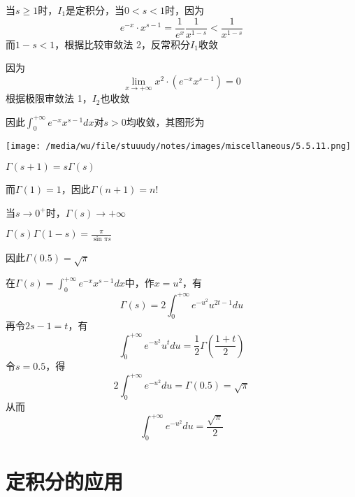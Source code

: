 \documentclass[11pt]{article}
\begin{document}
当\(s\ge1\)时，\(I_1\)是定积分，当\(0<s<1\)时，因为
\begin{equation*}
e^{-x}\cdot x^{s-1}=\frac{1}{e^x}\frac{1}{x^{1-s}}<\frac{1}{x^{1-s}}
\end{equation*}
而\(1-s<1\)，根据比较审敛法 2，反常积分\(I_1\)收敛

因为
\begin{equation*}
\lim_{x\to+\infty}x^2\cdot(e^{-x}x^{s-1})=0
\end{equation*}
根据极限审敛法 1，\(I_2\)也收敛

因此\(\int_0^{+\infty}e^{-x}x^{s-1}dx\)对\(s>0\)均收敛，其图形为
\begin{center}
\texttt{[image: /media/wu/file/stuuudy/notes/images/miscellaneous/5.5.11.png]}
\end{center}

\begin{proposition}[递推公式]
\(\Gamma(s+1)=s\Gamma(s)\)
\end{proposition}

而\(\Gamma(1)=1\)，因此\(\Gamma(n+1)=n!\)

\begin{proposition}[]
当\(s\to0^+\)时，\(\Gamma(s)\to+\infty\)
\end{proposition}

\begin{proposition}[余元公式]
\(\Gamma(s)\Gamma(1-s)=\frac{\pi}{\sin\pi s}\)
\end{proposition}

因此\(\Gamma(0.5)=\sqrt{\pi}\)

在\(\Gamma(s)=\int_0^{+\infty}e^{-x}x^{s-1}dx\)中，作\(x=u^2\)，有
\begin{equation*}
\Gamma(s)=2\int_0^{+\infty}e^{-u^2}u^{2t-1}du
\end{equation*}
再令\(2s-1=t\)，有
\begin{equation*}
 \int_0^{+\infty}e^{-u^2}u^tdu=\frac{1}{2}\Gamma(\frac{1+t}{2})
\end{equation*}
令\(s=0.5\)，得
\begin{equation*}
2\int_0^{+\infty}e^{-u^2}du=\Gamma(0.5)=\sqrt{\pi}
\end{equation*}
从而
\begin{equation*}
\int_0^{+\infty}e^{-u^2}du=\frac{\sqrt{\pi}}{2}
\end{equation*}





\section{定积分的应用}
\label{sec:org12f37c3}
\end{document}
